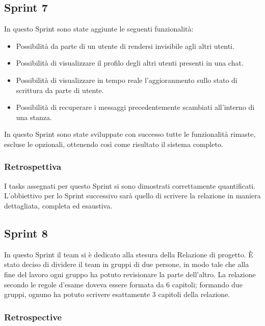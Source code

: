 \subsection{Sprint 7}

In questo Sprint sono state aggiunte le seguenti funzionalità:

\begin{itemize}
%
    \item Possibilità da parte di un utente di rendersi invisibile agli altri utenti.
%
    \item Possibilità di visualizzare il profilo degli altri utenti presenti in una chat.
%
    \item Possibilità di visualizzare in tempo reale l'aggioranmento sullo stato di scrittura da parte di utente.
%
    \item Possibilità di recuperare i messaggi precedentemente scambiati all'interno di una stanza.
%
\end{itemize}

In questo Sprint sono state sviluppate con successo tutte le funzionalità rimaste, escluse le opzionali, ottenendo così come risultato il sistema completo.

\subsubsection{Retrospettiva}

I tasks assegnati per questo Sprint si sono dimostrati correttamente quantificati. L'obbiettivo per lo Sprint successivo sarà quello di scrivere la relazione in maniera dettagliata, completa ed esaustiva.

\subsection{Sprint 8}

In questo Sprint il team si è dedicato alla stesura della Relazione di progetto.
È stato deciso di dividere il team in gruppi di due persone, in modo tale che alla fine del lavoro ogni gruppo ha potuto revisionare la parte dell'altro.
La relazione secondo le regole d'esame doveva essere formata da 6 capitoli; formando due gruppi, ognuno ha potuto scrivere esattamente 3 capitoli della relazione.

\subsubsection{Retrospective}

